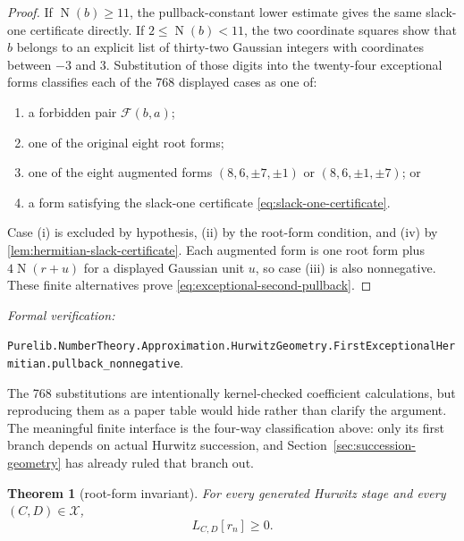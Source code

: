 \documentclass[11pt]{article}
\newtheorem{theorem}{Theorem}[section]
\newcommand{\Norm}[1]{\operatorname{N}\!\left(#1\right)}
\newcommand{\leanref}[1]{\par\smallskip\noindent
  \emph{Formal verification:}\par\nobreak
  {\raggedright\nolinkurl{#1}.\par}}
\begin{document}
\begin{proof}
If $\Norm b\ge11$, the pullback-constant lower estimate gives the same
slack-one certificate directly.  If $2\le\Norm b<11$, the two coordinate
squares show that $b$ belongs to an explicit list of thirty-two Gaussian
integers with coordinates between $-3$ and $3$.  Substitution of those
digits into the twenty-four exceptional forms classifies each of the 768
displayed cases as one of:
\begin{enumerate}[label=(\roman*)]
\item a forbidden pair $\mathcal F(b,a)$;
\item one of the original eight root forms;
\item one of the eight augmented forms
$(8,6,\pm7,\pm1)$ or $(8,6,\pm1,\pm7)$; or
\item a form satisfying the slack-one certificate
\eqref{eq:slack-one-certificate}.
\end{enumerate}
Case (i) is excluded by hypothesis, (ii) by the root-form condition, and
(iv) by \cref{lem:hermitian-slack-certificate}.  Each augmented form is one
root form plus $4\Norm{r+u}$ for a displayed Gaussian unit $u$, so case (iii)
is also nonnegative.  These finite alternatives prove
\eqref{eq:exceptional-second-pullback}.
\end{proof}

\leanref{Purelib.NumberTheory.Approximation.HurwitzGeometry.FirstExceptionalHermitian.pullback_nonnegative}

The 768 substitutions are intentionally kernel-checked coefficient
calculations, but reproducing them as a paper table would hide rather than
clarify the argument.  The meaningful finite interface is the four-way
classification above: only its first branch depends on actual Hurwitz
succession, and Section~\ref{sec:succession-geometry} has already ruled that
branch out.

\begin{theorem}[root-form invariant]
\label{thm:root-form-invariant}
For every generated Hurwitz stage and every $(C,D)\in\mathcal X$,
\begin{equation}
\label{eq:root-form-invariant}
                              L_{C,D}[r_n]\ge0.
\end{equation}
\end{theorem}
\end{document}
